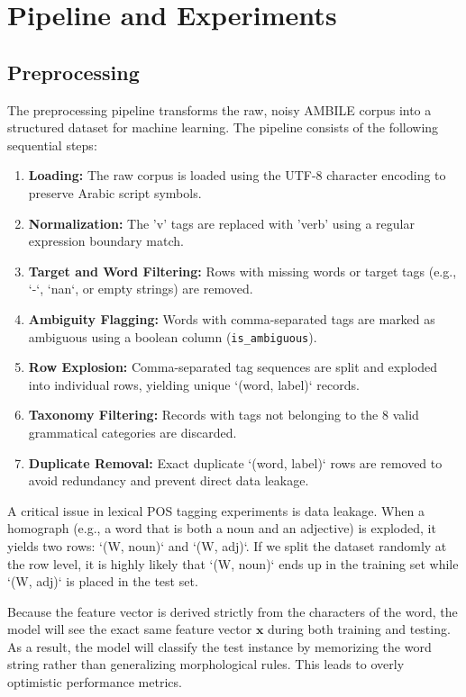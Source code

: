 \documentclass[12pt,a4paper]{article}
\begin{document}
\section{Pipeline and Experiments}

\subsection{Preprocessing}
The preprocessing pipeline transforms the raw, noisy AMBILE corpus into a structured dataset for machine learning. The pipeline consists of the following sequential steps:
\begin{enumerate}
  \item \textbf{Loading:} The raw corpus is loaded using the UTF-8 character encoding to preserve Arabic script symbols.
  \item \textbf{Normalization:} The 'v' tags are replaced with 'verb' using a regular expression boundary match.
  \item \textbf{Target and Word Filtering:} Rows with missing words or target tags (e.g., `-`, `nan`, or empty strings) are removed.
  \item \textbf{Ambiguity Flagging:} Words with comma-separated tags are marked as ambiguous using a boolean column (\texttt{is\_ambiguous}).
  \item \textbf{Row Explosion:} Comma-separated tag sequences are split and exploded into individual rows, yielding unique `(word, label)` records.
  \item \textbf{Taxonomy Filtering:} Records with tags not belonging to the 8 valid grammatical categories are discarded.
  \item \textbf{Duplicate Removal:} Exact duplicate `(word, label)` rows are removed to avoid redundancy and prevent direct data leakage.
\end{enumerate}

A critical issue in lexical POS tagging experiments is data leakage. When a homograph (e.g., a word that is both a noun and an adjective) is exploded, it yields two rows: `(W, noun)` and `(W, adj)`. If we split the dataset randomly at the row level, it is highly likely that `(W, noun)` ends up in the training set while `(W, adj)` is placed in the test set. 

Because the feature vector is derived strictly from the characters of the word, the model will see the exact same feature vector $\mathbf{x}$ during both training and testing. As a result, the model will classify the test instance by memorizing the word string rather than generalizing morphological rules. This leads to overly optimistic performance metrics.
\end{document}
